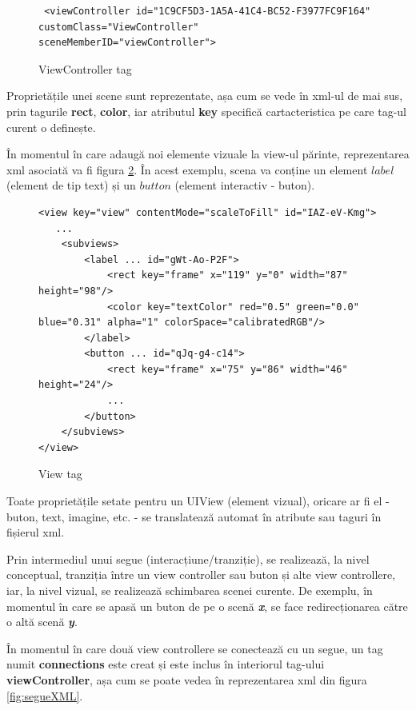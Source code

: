 \begin{figure}[!htbp]
\lstset{language=XML}
\begin{lstlisting}
 <viewController id="1C9CF5D3-1A5A-41C4-BC52-F3977FC9F164" customClass="ViewController" sceneMemberID="viewController">
\end{lstlisting}
\caption{ViewController tag}\label{fig:viewController}
\end{figure}



Proprietățile unei scene sunt reprezentate, așa cum se vede în xml-ul de mai sus, prin tagurile \textbf{rect}, \textbf{color}, iar atributul \textbf{key} specifică cartacteristica pe care tag-ul curent o definește.

În momentul în care adaugă noi elemente vizuale la view-ul părinte, reprezentarea xml asociată va fi figura \ref{fig:view}. În acest exemplu, scena va conține un element $label$ (element de tip text) și un $button$ (element interactiv - buton).

\begin{figure}[!htbp]
\lstset{language=XML}
\begin{lstlisting}
<view key="view" contentMode="scaleToFill" id="IAZ-eV-Kmg">
   ...
    <subviews>
        <label ... id="gWt-Ao-P2F">
            <rect key="frame" x="119" y="0" width="87" height="98"/>
            <color key="textColor" red="0.5" green="0.0" blue="0.31" alpha="1" colorSpace="calibratedRGB"/>
        </label>
        <button ... id="qJq-g4-c14">
            <rect key="frame" x="75" y="86" width="46" height="24"/>
            ...
        </button>
    </subviews>
</view>
\end{lstlisting}
\caption{View tag}\label{fig:view}
\end{figure}

Toate proprietățile setate pentru un UIView (element vizual), oricare ar fi el - buton, text, imagine, etc. - se translatează automat în atribute sau taguri în fișierul xml.

Prin intermediul unui segue (interacțiune/tranziție), se realizează, la nivel conceptual, tranziția între un view controller sau buton și alte view controllere, iar, la nivel vizual, se realizează schimbarea scenei curente. De exemplu, în momentul în care se apasă un buton de pe o scenă \textbf{\textit{x}}, se face redirecționarea către o altă scenă \textbf{\textit{y}}. 

În momentul în care două view controllere se conectează cu un segue, un tag numit \textbf{connections} este creat și este inclus în interiorul tag-ului \textbf{viewController}, așa cum se poate vedea în reprezentarea xml din figura \ref{fig:segueXML}.

